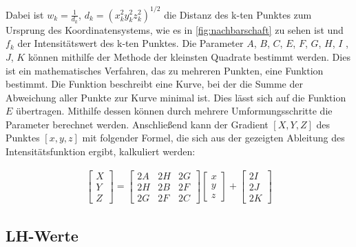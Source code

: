 Dabei ist $w_{k} = \frac{1}{d_{k}}$, $d_{k} =(x_{k}^2y_{k}^2z_{k}^2)^{1/2}$  die Distanz des k-ten Punktes zum Ursprung des Koordinatensystems, wie es in \autoref{fig:nachbarschaft} zu sehen ist und $f_{k}$ der Intensitätswert des k-ten Punktes. 
\newline
Die Parameter $A$, $B$, $C$, $E$, $F$, $G$, $H$, $I$ ,$J$, $K$  können mithilfe der Methode der kleinsten Quadrate bestimmt werden. Dies ist ein mathematisches Verfahren, das zu mehreren Punkten, eine Funktion bestimmt. Die Funktion beschreibt eine Kurve, bei der die Summe der Abweichung aller Punkte zur Kurve minimal ist. Dies lässt sich auf die Funktion $E$ übertragen. Mithilfe dessen können durch mehrere Umformungsschritte die Parameter berechnet werden. Anschließend kann der Gradient $[X, Y, Z]$ des Punktes $[x, y, z]$ mit folgender Formel, die sich aus der gezeigten Ableitung des Intensitätsfunktion ergibt, kalkuliert werden:


\begin{align}
\begin{bmatrix}
           X \\
           Y \\
           Z
         \end{bmatrix}    
 	= \begin{bmatrix}
           2A & 2H & 2G \\
           2H & 2B & 2F \\
           2G & 2F & 2C
         \end{bmatrix}
         \begin{bmatrix}
           x \\
           y \\
           z
         \end{bmatrix}
	+\begin{bmatrix}
           2I \\
           2J \\
           2K
         \end{bmatrix}
  \end{align}



\subsection{LH-Werte}

